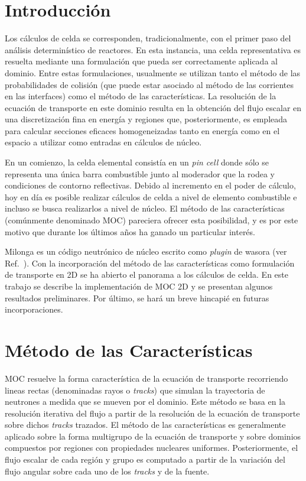 \documentclass[11pt]{article}
\begin{document}
\section{Introducción}

Los cálculos de celda se corresponden, tradicionalmente, con el primer paso del análisis determinístico de reactores. En esta instancia, una celda representativa es resuelta mediante una formulación que pueda ser correctamente aplicada al dominio. Entre estas formulaciones, usualmente se utilizan tanto el método de las probabilidades de colisión (que puede estar asociado al método de las corrientes en las interfaces) como el método de las características. La resolución de la ecuación de transporte en este dominio resulta en la obtención del flujo escalar en una discretización fina en energía y regiones que, posteriormente, es empleada para calcular secciones eficaces homogeneizadas tanto en energía como en el espacio a utilizar como entradas en cálculos de núcleo.

En un comienzo, la celda elemental consistía en un \emph{pin cell} donde sólo se representa una única barra combustible junto al moderador que la rodea y condiciones de contorno reflectivas. Debido al incremento en el poder de cálculo, hoy en día es posible realizar cálculos de celda a nivel de elemento combustible e incluso se busca realizarlos a nivel de núcleo. El método de las características (comúnmente denominado MOC) pareciera ofrecer esta posibilidad, y es por este motivo que durante los últimos años ha ganado un particular interés. 

Milonga es un código neutrónico de núcleo escrito como \emph{plugin} de wasora (ver Ref.~\cite{wasora}). Con la incorporación del método de las características como formulación de transporte en 2D se ha abierto el panorama a los cálculos de celda. En este trabajo se describe la implementación de MOC 2D y se presentan algunos resultados preliminares. Por último, se hará un breve hincapié en futuras incorporaciones.


\section{Método de las Características}

MOC resuelve la forma característica de la ecuación de transporte recorriendo lineas rectas (denominadas rayos o \emph{tracks}) que simulan la trayectoria de neutrones a medida que se mueven por el dominio. Este método se basa en la resolución iterativa del flujo a partir de la resolución de la ecuación de transporte sobre dichos \emph{tracks} trazados. El método de las características es generalmente aplicado sobre la forma multigrupo de la ecuación de transporte y sobre dominios compuestos por regiones con propiedades nucleares uniformes. Posteriormente, el flujo escalar de cada región y grupo es computado a partir de la variación del flujo angular sobre cada uno de los \emph{tracks} y de la fuente. 
\end{document}
